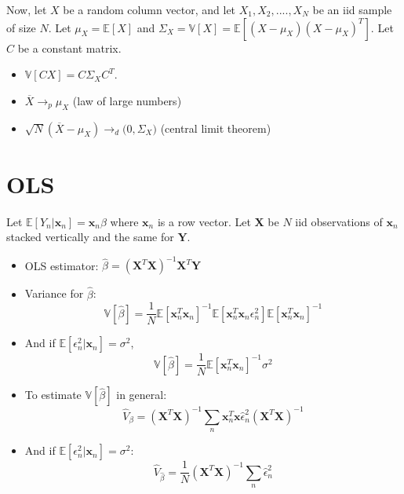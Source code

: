 \documentclass[12pt]{article}
\newcommand\ov{\overline}
\newcommand\BB{\mathbb}
\newcommand\EE{\mathbb{E}}
\newcommand\mc{\mathcal}
\numberwithin{equation}{section}
\numberwithin{figure}{section}
\numberwithin{table}{section}
\begin{document}
    Now, let $X$ be a random column vector, and let $X_1,X_2,....,X_{N}$ be an iid sample of size $N$. Let $\mu_{X}=\EE[X]$ and $\Sigma_{X} = \BB{V}[X] = \EE[(X-\mu_{X})(X-\mu_{X})^T]$. Let $C$ be a constant matrix.
  \begin{itemize}
  \item $\BB{V}[CX] = C\Sigma_{X}C^{T}$.
  \item $\ov{X}\rightarrow_{p} \mu_{X}$ (law of large numbers)
  \item $\sqrt{N}(\ov{X} - \mu_{X}) \rightarrow_{d} \mc(0,\Sigma_{X})$ (central limit theorem)
  \end{itemize}

  \section*{OLS}
  Let $\EE[Y_{n}|\bm{x}_{n}] = \bm{x}_{n}\beta$ where $\bm{x}_{n}$ is a row vector. Let $\bm{X}$ be $N$ iid observations of $\bm{x}_{n}$ stacked vertically and the same for $\bm{Y}$.
  \begin{itemize}
  \item OLS estimator: $\hat{\beta} = (\bm{X}^{T}\bm{X})^{-1}\bm{X}^{T}\bm{Y}$
  \item Variance for $\hat{\beta}$:
    \[ \BB{V}[\hat{\beta}] =  \frac{1}{N}\EE[\bm{x}_{n}^{T}\bm{x}_n]^{-1}\EE[\bm{x}^{T}_{n}\bm{x}_{n}\epsilon^2_{n}]\EE[\bm{x}_{n}^{T}\bm{x}_n]^{-1} \]
  \item And if $\EE[\epsilon^2_{n}|\bm{x}_{n}] = \sigma^2$,
        \[ \BB{V}[\hat{\beta}] =  \frac{1}{N}\EE[\bm{x}_{n}^{T}\bm{x}_n]^{-1}\sigma^2 \]
      \item  To estimate $\BB{V}[\hat{\beta}]$ in general:
        \[ \hat{V}_{\beta} = (\bm{X}^{T}\bm{X})^{-1}\sum_{n}\bm{x}^{T}_{n}\bm{x}\hat{\epsilon}_{n}^2(\bm{X}^{T}\bm{X})^{-1} \]
        
      \item And if $\EE[\epsilon^2_{n}|\bm{x}_{n}] = \sigma^2$:
        \[\hat{V}_{\hat{\beta}} = \frac{1}{N}(\bm{X}^{T}\bm{X})^{-1}\sum_{n}\hat{\epsilon}_{n}^2 \]
  \end{itemize}
  
\end{document}
